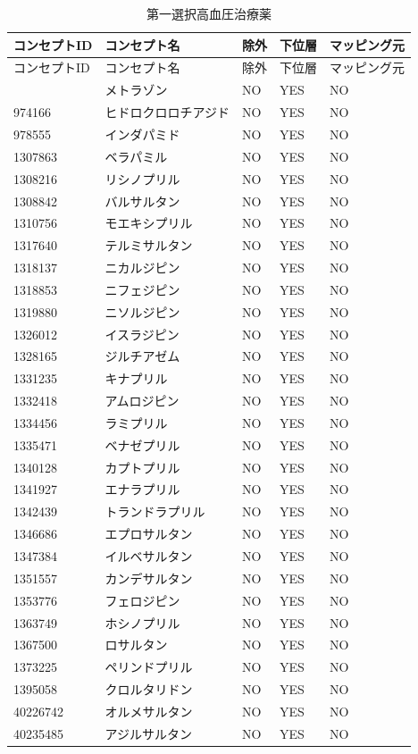 \documentclass[
  11pt]{book}
\theoremstyle{definition}
\theoremstyle{definition}
\theoremstyle{definition}
\theoremstyle{definition}
\theoremstyle{remark}
\begin{document}
\begin{longtable}[]{@{}lllll@{}}
\caption{\label{tab:HTN1yrFO1stLine} 第一選択高血圧治療薬}\tabularnewline
\toprule\noalign{}
コンセプトID & コンセプト名 & 除外 & 下位層 & マッピング元 \\
\midrule\noalign{}
\endfirsthead
\toprule\noalign{}
コンセプトID & コンセプト名 & 除外 & 下位層 & マッピング元 \\
\midrule\noalign{}
\endhead
\bottomrule\noalign{}
\endlastfoot
907013 & メトラゾン & NO & YES & NO \\
974166 & ヒドロクロロチアジド & NO & YES & NO \\
978555 & インダパミド & NO & YES & NO \\
1307863 & ベラパミル & NO & YES & NO \\
1308216 & リシノプリル & NO & YES & NO \\
1308842 & バルサルタン & NO & YES & NO \\
1310756 & モエキシプリル & NO & YES & NO \\
1317640 & テルミサルタン & NO & YES & NO \\
1318137 & ニカルジピン & NO & YES & NO \\
1318853 & ニフェジピン & NO & YES & NO \\
1319880 & ニソルジピン & NO & YES & NO \\
1326012 & イスラジピン & NO & YES & NO \\
1328165 & ジルチアゼム & NO & YES & NO \\
1331235 & キナプリル & NO & YES & NO \\
1332418 & アムロジピン & NO & YES & NO \\
1334456 & ラミプリル & NO & YES & NO \\
1335471 & ベナゼプリル & NO & YES & NO \\
1340128 & カプトプリル & NO & YES & NO \\
1341927 & エナラプリル & NO & YES & NO \\
1342439 & トランドラプリル & NO & YES & NO \\
1346686 & エプロサルタン & NO & YES & NO \\
1347384 & イルベサルタン & NO & YES & NO \\
1351557 & カンデサルタン & NO & YES & NO \\
1353776 & フェロジピン & NO & YES & NO \\
1363749 & ホシノプリル & NO & YES & NO \\
1367500 & ロサルタン & NO & YES & NO \\
1373225 & ペリンドプリル & NO & YES & NO \\
1395058 & クロルタリドン & NO & YES & NO \\
40226742 & オルメサルタン & NO & YES & NO \\
40235485 & アジルサルタン & NO & YES & NO \\
\end{longtable}
\end{document}
